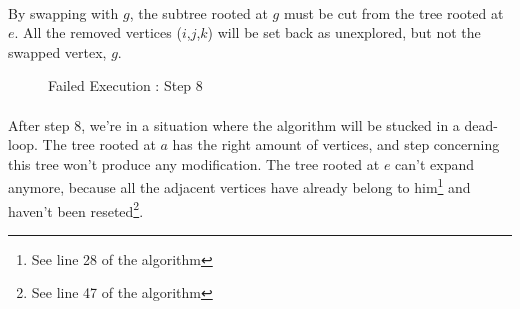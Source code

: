 \paragraph{}
By swapping with $g$, the subtree rooted at $g$ must be cut from the tree
rooted at $e$. All the removed vertices ($i$,$j$,$k$) will be set back as
unexplored, but not the swapped vertex, $g$.

\begin{figure}[H]
  \caption{Failed Execution : Step 8}
  \begin{center}
    \begin{tikzpicture}[scale=0.9,transform shape]
      
    \end{tikzpicture}
  \end{center}
\end{figure}

\paragraph{}
After step 8, we're in a situation where the algorithm will be stucked in a
dead-loop. The tree rooted at $a$ has the right amount of vertices, and step
concerning this tree won't produce any modification. The tree rooted at $e$
can't expand anymore, because all the adjacent vertices have already belong to
him\footnote{See line 28 of the algorithm} and haven't been reseted\footnote{
See line 47 of the algorithm}.
